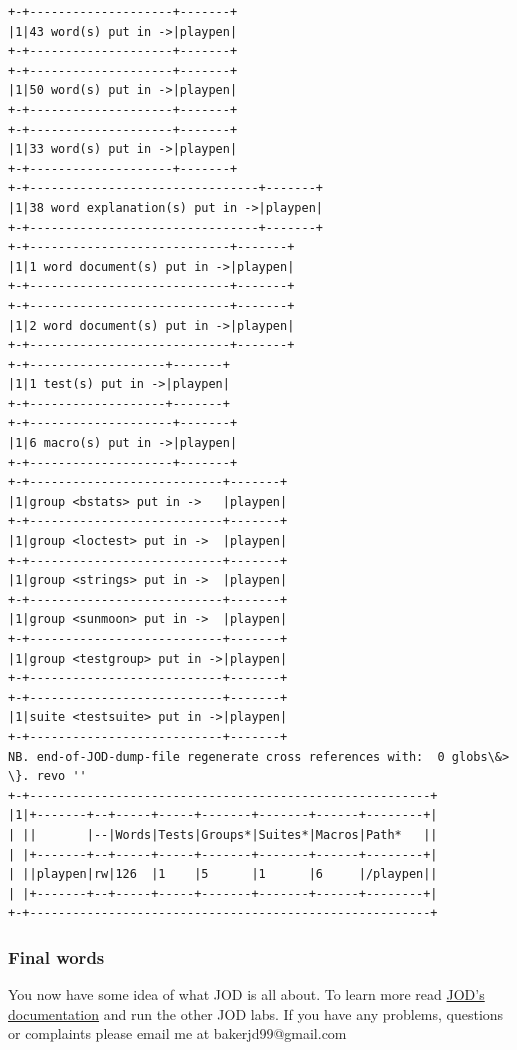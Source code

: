 \documentclass[11pt,letter,landscape]{article}
\begin{document}
    \begin{Verbatim}[commandchars=\\\{\}]
+-+--------------------+-------+
|1|43 word(s) put in ->|playpen|
+-+--------------------+-------+
+-+--------------------+-------+
|1|50 word(s) put in ->|playpen|
+-+--------------------+-------+
+-+--------------------+-------+
|1|33 word(s) put in ->|playpen|
+-+--------------------+-------+
+-+--------------------------------+-------+
|1|38 word explanation(s) put in ->|playpen|
+-+--------------------------------+-------+
+-+----------------------------+-------+
|1|1 word document(s) put in ->|playpen|
+-+----------------------------+-------+
+-+----------------------------+-------+
|1|2 word document(s) put in ->|playpen|
+-+----------------------------+-------+
+-+-------------------+-------+
|1|1 test(s) put in ->|playpen|
+-+-------------------+-------+
+-+--------------------+-------+
|1|6 macro(s) put in ->|playpen|
+-+--------------------+-------+
+-+---------------------------+-------+
|1|group <bstats> put in ->   |playpen|
+-+---------------------------+-------+
|1|group <loctest> put in ->  |playpen|
+-+---------------------------+-------+
|1|group <strings> put in ->  |playpen|
+-+---------------------------+-------+
|1|group <sunmoon> put in ->  |playpen|
+-+---------------------------+-------+
|1|group <testgroup> put in ->|playpen|
+-+---------------------------+-------+
+-+---------------------------+-------+
|1|suite <testsuite> put in ->|playpen|
+-+---------------------------+-------+
NB. end-of-JOD-dump-file regenerate cross references with:  0 globs\&> \}. revo ''
+-+--------------------------------------------------------+
|1|+-------+--+-----+-----+-------+-------+------+--------+|
| ||       |--|Words|Tests|Groups*|Suites*|Macros|Path*   ||
| |+-------+--+-----+-----+-------+-------+------+--------+|
| ||playpen|rw|126  |1    |5      |1      |6     |/playpen||
| |+-------+--+-----+-----+-------+-------+------+--------+|
+-+--------------------------------------------------------+
    \end{Verbatim}

    \hypertarget{final-words}{%
\subsubsection{Final words}\label{final-words}}

You now have some idea of what JOD is all about. To learn more read
\href{https://github.com/jsoftware/general_joddocument/blob/master/pdfdoc/jod.pdf}{JOD's
documentation} and run the other JOD labs. If you have any problems,
questions or complaints please email me at bakerjd99@gmail.com
\end{document}
